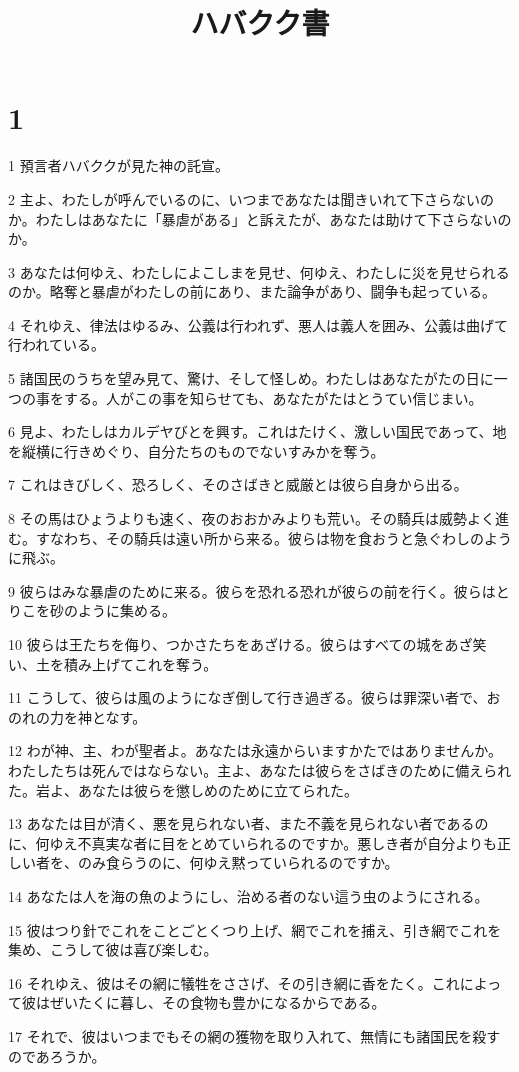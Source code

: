 

\title{ハバクク書}


\chapter{1}

\par 1 預言者ハバククが見た神の託宣。
\par 2 主よ、わたしが呼んでいるのに、いつまであなたは聞きいれて下さらないのか。わたしはあなたに「暴虐がある」と訴えたが、あなたは助けて下さらないのか。
\par 3 あなたは何ゆえ、わたしによこしまを見せ、何ゆえ、わたしに災を見せられるのか。略奪と暴虐がわたしの前にあり、また論争があり、闘争も起っている。
\par 4 それゆえ、律法はゆるみ、公義は行われず、悪人は義人を囲み、公義は曲げて行われている。
\par 5 諸国民のうちを望み見て、驚け、そして怪しめ。わたしはあなたがたの日に一つの事をする。人がこの事を知らせても、あなたがたはとうてい信じまい。
\par 6 見よ、わたしはカルデヤびとを興す。これはたけく、激しい国民であって、地を縦横に行きめぐり、自分たちのものでないすみかを奪う。
\par 7 これはきびしく、恐ろしく、そのさばきと威厳とは彼ら自身から出る。
\par 8 その馬はひょうよりも速く、夜のおおかみよりも荒い。その騎兵は威勢よく進む。すなわち、その騎兵は遠い所から来る。彼らは物を食おうと急ぐわしのように飛ぶ。
\par 9 彼らはみな暴虐のために来る。彼らを恐れる恐れが彼らの前を行く。彼らはとりこを砂のように集める。
\par 10 彼らは王たちを侮り、つかさたちをあざける。彼らはすべての城をあざ笑い、土を積み上げてこれを奪う。
\par 11 こうして、彼らは風のようになぎ倒して行き過ぎる。彼らは罪深い者で、おのれの力を神となす。
\par 12 わが神、主、わが聖者よ。あなたは永遠からいますかたではありませんか。わたしたちは死んではならない。主よ、あなたは彼らをさばきのために備えられた。岩よ、あなたは彼らを懲しめのために立てられた。
\par 13 あなたは目が清く、悪を見られない者、また不義を見られない者であるのに、何ゆえ不真実な者に目をとめていられるのですか。悪しき者が自分よりも正しい者を、のみ食らうのに、何ゆえ黙っていられるのですか。
\par 14 あなたは人を海の魚のようにし、治める者のない這う虫のようにされる。
\par 15 彼はつり針でこれをことごとくつり上げ、網でこれを捕え、引き網でこれを集め、こうして彼は喜び楽しむ。
\par 16 それゆえ、彼はその網に犠牲をささげ、その引き網に香をたく。これによって彼はぜいたくに暮し、その食物も豊かになるからである。
\par 17 それで、彼はいつまでもその網の獲物を取り入れて、無情にも諸国民を殺すのであろうか。

